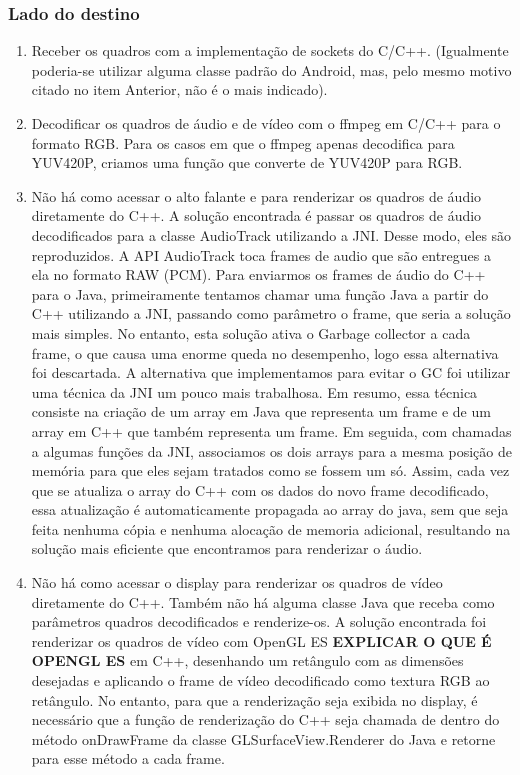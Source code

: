 \documentclass{acm_proc_article-sp}
\newcommand{\todo}[1]{\textcolor[rgb]{1.00,0.00,0.00}{\bf \uppercase{#1}}}
\begin{document}
\subsubsection{Lado do destino}
\begin{enumerate}
 \item Receber os quadros com a implementação de sockets do C/C++. (Igualmente poderia-se utilizar alguma classe padrão do Android, mas, pelo mesmo motivo citado no item Anterior, não é o mais indicado).
 \item Decodificar os quadros de áudio e de vídeo com o ffmpeg em C/C++ para o formato RGB. Para os casos em que o ffmpeg apenas decodifica para YUV420P, criamos uma função que converte de YUV420P para RGB.
 \item Não há como acessar o alto falante e para renderizar os quadros de áudio diretamente do C++. A solução encontrada é passar os quadros de áudio decodificados para a classe AudioTrack utilizando a JNI. Desse modo, eles são reproduzidos. A API AudioTrack toca frames de audio que são entregues a ela no formato RAW (PCM). Para enviarmos os frames de áudio do C++ para o Java, primeiramente tentamos chamar uma função Java a partir do C++ utilizando a JNI, passando como parâmetro o frame, que seria a solução mais simples. No entanto, esta solução ativa o Garbage collector a cada frame, o que causa uma enorme queda no desempenho, logo essa alternativa foi descartada. A alternativa que implementamos para evitar o GC foi utilizar uma técnica da JNI um pouco mais trabalhosa. Em resumo, essa técnica consiste na criação de um array em Java que representa um frame e de um array em C++ que também representa um frame. Em seguida, com chamadas a algumas funções da JNI, associamos os dois arrays para a mesma posição de memória para que eles sejam tratados como se fossem um só. Assim, cada vez que se atualiza o array do C++ com os dados do novo frame decodificado, essa atualização é automaticamente propagada ao array do java, sem que seja feita nenhuma cópia e nenhuma alocação de memoria adicional, resultando na solução mais eficiente que encontramos para renderizar o áudio.
 \item Não há como acessar o display para renderizar os quadros de vídeo diretamente do C++. Também não há alguma classe Java que receba como parâmetros quadros decodificados e renderize-os. A solução encontrada foi renderizar os quadros de vídeo com OpenGL ES \todo{explicar o que é opengl es} em C++, desenhando um retângulo com as dimensões desejadas e aplicando o frame de vídeo decodificado como textura RGB ao retângulo. No entanto, para que a renderização seja exibida no display, é necessário que a função de renderização do C++ seja chamada de dentro do método onDrawFrame da classe GLSurfaceView.Renderer do Java e retorne para esse método a cada frame.
\end{enumerate}
\end{document}
